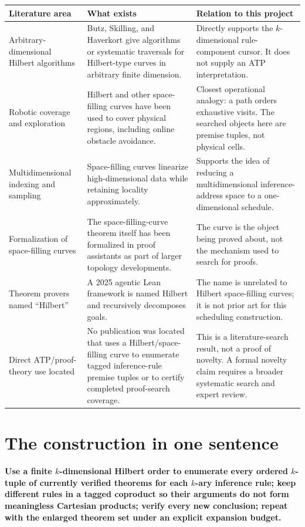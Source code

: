 \documentclass[11pt]{article}
\theoremstyle{hilberttheorem}
\begin{document}
\small
\begin{longtable}{@{}>{\raggedright\arraybackslash}p{}>{\raggedright\arraybackslash}p{}>{\raggedright\arraybackslash}p{}@{}}
\toprule
\textbf{Literature area} & \textbf{What exists} & \textbf{Relation to this project} \\
\midrule
\endhead
\bottomrule
\endlastfoot
Arbitrary-dimensional Hilbert algorithms & Butz, Skilling, and Haverkort give algorithms or systematic traversals for Hilbert-type curves in arbitrary finite dimension. & Directly supports the $k$-dimensional rule-component cursor. It does not supply an ATP interpretation. \\
Robotic coverage and exploration & Hilbert and other space-filling curves have been used to cover physical regions, including online obstacle avoidance. & Closest operational analogy: a path orders exhaustive visits. The searched objects here are premise tuples, not physical cells. \\
Multidimensional indexing and sampling & Space-filling curves linearize high-dimensional data while retaining locality approximately. & Supports the idea of reducing a multidimensional inference-address space to a one-dimensional schedule. \\
Formalization of space-filling curves & The space-filling-curve theorem itself has been formalized in proof assistants as part of larger topology developments. & The curve is the object being proved about, not the mechanism used to search for proofs. \\
Theorem provers named ``Hilbert'' & A 2025 agentic Lean framework is named Hilbert and recursively decomposes goals. & The name is unrelated to Hilbert space-filling curves; it is not prior art for this scheduling construction. \\
Direct ATP/proof-theory use located & No publication was located that uses a Hilbert/space-filling curve to enumerate tagged inference-rule premise tuples or to certify completed proof-search coverage. & This is a literature-search result, not a proof of novelty. A formal novelty claim requires a broader systematic search and expert review. \\
\end{longtable}
\normalsize

\section{The construction in one sentence}\label{sec:one-sentence}
\textbf{Use a finite $k$-dimensional Hilbert order to enumerate every ordered $k$-tuple of currently verified theorems for each $k$-ary inference rule; keep different rules in a tagged coproduct so their arguments do not form meaningless Cartesian products; verify every new conclusion; repeat with the enlarged theorem set under an explicit expansion budget.}
\end{document}
